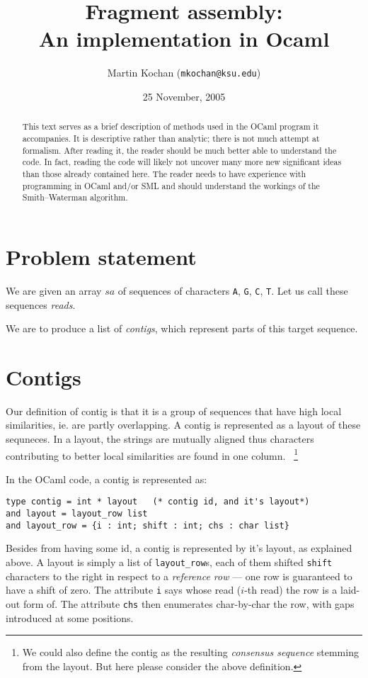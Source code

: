 \documentclass[11pt, oneside]{article}
\title{Fragment assembly:\\ An implementation in Ocaml}
\author{Martin Kochan ({\tt mkochan@ksu.edu})}
\date{25 November, 2005}
\begin{document}
\maketitle

\begin{abstract}
This text serves as a brief description of methods used in the OCaml program it accompanies.
It is descriptive rather than analytic; there is not much attempt at formalism.
After reading it, the reader should be much better able to understand the code.
In fact, reading the code will likely not uncover many more new significant ideas than
those already contained here.
The reader needs to have experience with programming in OCaml and/or SML
and should understand the workings of the Smith--Waterman algorithm.
\end{abstract}

\section{Problem statement}

We are given an array $sa$ of sequences of characters {\tt A}, {\tt G}, {\tt C}, {\tt T}. 
Let us call these sequences \emph{reads}.

We are to produce a list of \emph{contigs}, which represent parts of this target sequence.

\section{Contigs}

Our definition of contig is that it is a group of sequences that have high local similarities,
ie. are partly overlapping. A contig is represented as a layout of these sequneces.
In a layout, the strings are mutually aligned thus characters contributing to better
local similarities are found in one column.~
\footnote{
We could also define the contig as the resulting \emph{consensus sequence} stemming
from the layout. But here please consider the above definition. 
}

In the OCaml code, a contig is represented as:
\begin{verbatim}
type contig = int * layout   (* contig id, and it's layout*)
and layout = layout_row list
and layout_row = {i : int; shift : int; chs : char list}
\end{verbatim}
Besides from having some id, a contig is represented by it's layout, as explained above.
A layout is simply a list of
{\tt layout\_row}s, each of them shifted {\tt shift} characters to the right in respect to
a \emph{reference row} --- one row is guaranteed to have a shift of zero.
The attribute {\tt i} says whose read ($i$-th read) the row is a laid-out form of. 
The attribute {\tt chs} then enumerates char-by-char the row, with gaps introduced
at some positions.
\end{document}
